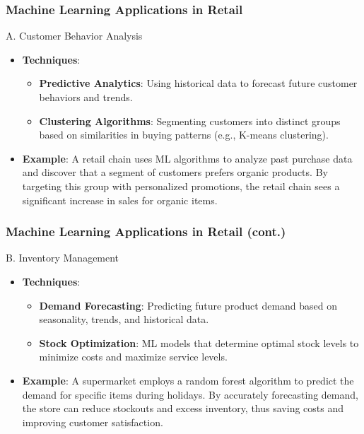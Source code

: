 \documentclass{beamer}
\begin{document}
\begin{frame}[fragile]
    \frametitle{Machine Learning Applications in Retail}
    \begin{block}{A. Customer Behavior Analysis}
        \begin{itemize}
            \item \textbf{Techniques}:
            \begin{itemize}
                \item \textbf{Predictive Analytics}: Using historical data to forecast future customer behaviors and trends.
                \item \textbf{Clustering Algorithms}: Segmenting customers into distinct groups based on similarities in buying patterns (e.g., K-means clustering).
            \end{itemize}
            \item \textbf{Example}: 
            A retail chain uses ML algorithms to analyze past purchase data and discover that a segment of customers prefers organic products. By targeting this group with personalized promotions, the retail chain sees a significant increase in sales for organic items.
        \end{itemize}
    \end{block}
\end{frame}

\begin{frame}[fragile]
    \frametitle{Machine Learning Applications in Retail (cont.)}
    \begin{block}{B. Inventory Management}
        \begin{itemize}
            \item \textbf{Techniques}:
            \begin{itemize}
                \item \textbf{Demand Forecasting}: Predicting future product demand based on seasonality, trends, and historical data.
                \item \textbf{Stock Optimization}: ML models that determine optimal stock levels to minimize costs and maximize service levels.
            \end{itemize}
            \item \textbf{Example}: 
            A supermarket employs a random forest algorithm to predict the demand for specific items during holidays. By accurately forecasting demand, the store can reduce stockouts and excess inventory, thus saving costs and improving customer satisfaction.
        \end{itemize}
    \end{block}
\end{frame}
\end{document}
